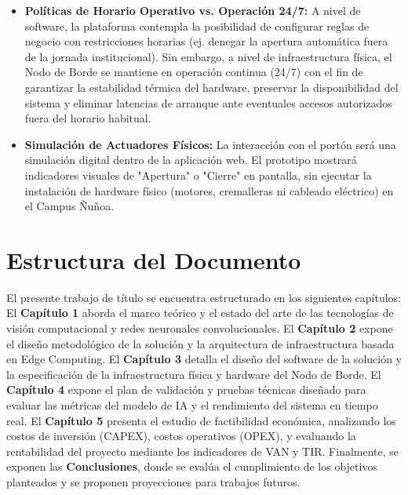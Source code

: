 \begin{itemize}
    \item \textbf{Políticas de Horario Operativo vs. Operación 24/7:} A nivel de software, la plataforma contempla la posibilidad de configurar reglas de negocio con restricciones horarias (ej. denegar la apertura automática fuera de la jornada institucional). Sin embargo, a nivel de infraestructura física, el Nodo de Borde se mantiene en operación continua (24/7) con el fin de garantizar la estabilidad térmica del hardware, preservar la disponibilidad del sistema y eliminar latencias de arranque ante eventuales accesos autorizados fuera del horario habitual.
    \item \textbf{Simulación de Actuadores Físicos:} La interacción con el portón será una simulación digital dentro de la aplicación web. El prototipo mostrará indicadores visuales de "Apertura" o "Cierre" en pantalla, sin ejecutar la instalación de hardware físico (motores, cremalleras ni cableado eléctrico) en el Campus Ñuñoa.
\end{itemize}

\section*{Estructura del Documento}
El presente trabajo de título se encuentra estructurado en los siguientes capítulos: 
El \textbf{Capítulo 1} aborda el marco teórico y el estado del arte de las tecnologías de visión computacional y redes neuronales convolucionales. 
El \textbf{Capítulo 2} expone el diseño metodológico de la solución y la arquitectura de infraestructura basada en Edge Computing. 
El \textbf{Capítulo 3} detalla el diseño del software de la solución y la especificación de la infraestructura física y hardware del Nodo de Borde.
El \textbf{Capítulo 4} expone el plan de validación y pruebas técnicas diseñado para evaluar las métricas del modelo de IA y el rendimiento del sistema en tiempo real.
El \textbf{Capítulo 5} presenta el estudio de factibilidad económica, analizando los costos de inversión (CAPEX), costos operativos (OPEX), y evaluando la rentabilidad del proyecto mediante los indicadores de VAN y TIR.
Finalmente, se exponen las \textbf{Conclusiones}, donde se evalúa el cumplimiento de los objetivos planteados y se proponen proyecciones para trabajos futuros.
